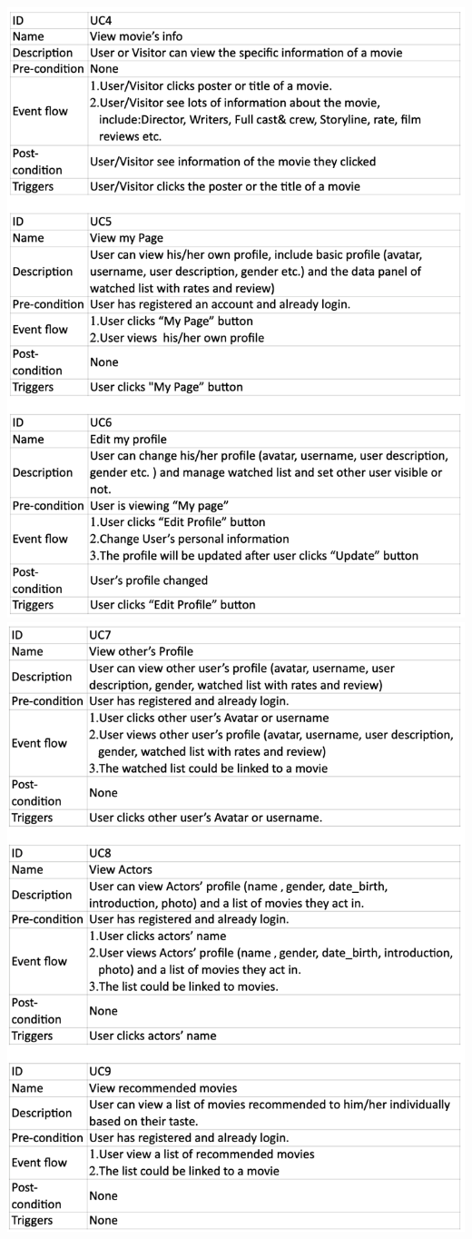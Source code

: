 \documentclass[12pt]{article}
\begin{document}
\includegraphics[width=1\linewidth]{UD2.png}\\\newpage
\includegraphics[width=1\linewidth]{UD3.png}\\\newpage
\end{document}
